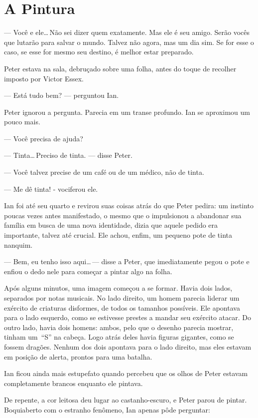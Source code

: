 \chapter{A Pintura}

--- Você e ele\ldots\,Não sei dizer quem exatamente. Mas ele é seu
amigo.  Serão vocês que lutarão para salvar o mundo. Talvez não agora,
mas um dia sim. Se for esse o caso, se esse for mesmo seu destino, é
melhor estar preparado.

Peter estava na sala, debruçado sobre uma folha, antes do toque de
recolher imposto por Victor Essex.

--- Está tudo bem? --- perguntou Ian.

Peter ignorou a pergunta. Parecia em um transe profundo. Ian se
aproximou um pouco mais.

--- Você precisa de ajuda?

--- Tinta\ldots\,Preciso de tinta. --- disse Peter.

--- Você talvez precise de um café ou de um médico, não de tinta.

--- Me dê tinta! - vociferou ele.

Ian foi até seu quarto e revirou suas coisas atrás do que Peter pedira:
um instinto poucas vezes antes manifestado, o mesmo que o impulsionou a
abandonar sua família em busca de uma nova identidade, dizia que aquele
pedido era importante, talvez até crucial. Ele achou, enfim, um pequeno
pote de tinta nanquim.

--- Bem, eu tenho isso aqui\ldots\,--- disse a Peter, que imediatamente
pegou o pote e enfiou o dedo nele para começar a pintar algo na folha.

Após alguns minutos, uma imagem começou a se formar. Havia dois lados,
separados por notas musicais. No lado direito, um homem parecia liderar
um exército de criaturas disformes, de todos os tamanhos possíveis. Ele
apontava para o lado esquerdo, como se estivesse prestes a mandar seu
exército atacar. Do outro lado, havia dois homens: ambos, pelo que o
desenho parecia mostrar, tinham um~“S” na cabeça. Logo atrás deles havia
figuras gigantes, como se fossem dragões. Nenhum dos dois apontava para
o lado direito, mas eles estavam em posição de alerta, prontos para uma
batalha.

Ian ficou ainda mais estupefato quando percebeu que os olhos de Peter
estavam completamente brancos enquanto ele pintava.

De repente, a cor leitosa deu lugar ao castanho-escuro, e Peter parou de
pintar. Boquiaberto com o estranho fenômeno, Ian apenas pôde perguntar:

